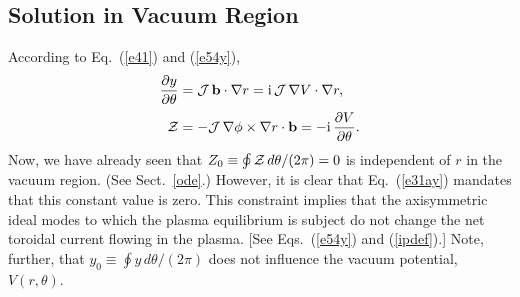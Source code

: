 \documentclass[12pt,prb,aps]{revtex4-1}
\begin{document}
\subsection{Solution in Vacuum Region}
According to Eq.~(\ref{e41}) and (\ref{e54y}),
\begin{align}\label{e30ay}
\frac{\partial y}{\partial \theta}&= {\cal J}\,{\bf b}\cdot\nabla r = {\rm i}\,{\cal J}\,\nabla V\cdot\nabla r,\\[0.5ex]
{\cal Z}&= -{\cal J}\,\nabla\phi\times\nabla r \cdot{\bf b} = - {\rm i}\,\frac{\partial V}{\partial\theta}.\label{e31ay}
\end{align}
Now, we have already seen that $Z_0\equiv \oint{\cal Z}\,d\theta/(2\pi)=0$ is independent of $r$ in the vacuum region.  (See Sect.~\ref{ode}.) 
However, it is clear that Eq.~(\ref{e31ay}) mandates that this constant value is zero. This constraint implies that the axisymmetric ideal modes to
which the plasma equilibrium is subject do not change the net toroidal current flowing in the plasma. [See Eqs.~(\ref{e54y}) and (\ref{ipdef}).]  Note, further, that $y_0\equiv \oint y\,d\theta/(2\pi)$ does
not influence the vacuum potential, $V(r,\theta)$. 
\end{document}
